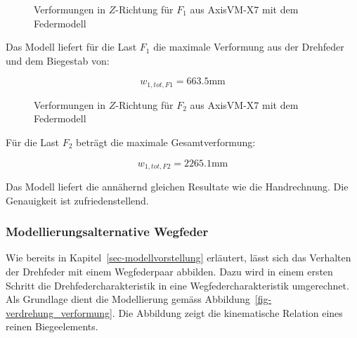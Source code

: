 \documentclass[
  11pt,
  letterpaper,
]{scrreprt}
\begin{document}
\begin{figure}[H]


\caption{\label{fig-kragarm-drehfeder-10}Verformungen in \(Z\)-Richtung
für \(F_1\) aus AxisVM-X7 mit dem Federmodell}

\end{figure}%

Das Modell liefert für die Last \(F_1\) die maximale Verformung aus der
Drehfeder und dem Biegestab von:

\[
w_{1,tot,F1} = 663.5 \text{mm}
\]

\begin{figure}[H]


\caption{\label{fig-kragarm-drehfeder-215}Verformungen in \(Z\)-Richtung
für \(F_2\) aus AxisVM-X7 mit dem Federmodell}

\end{figure}%

Für die Last \(F_2\) beträgt die maximale Gesamtverformung:

\[
w_{1,tot,F2} = 2265.1 \text{mm}
\]

Das Modell liefert die annähernd gleichen Resultate wie die
Handrechnung. Die Genauigkeit ist zufriedenstellend.

\subsubsection{Modellierungsalternative
Wegfeder}\label{modellierungsalternative-wegfeder}

Wie bereits in Kapitel~\ref{sec-modellvorstellung} erläutert, lässt sich
das Verhalten der Drehfeder mit einem Wegfederpaar abbilden. Dazu wird
in einem ersten Schritt die Drehfedercharakteristik in eine
Wegfedercharakteristik umgerechnet. Als Grundlage dient die Modellierung
gemäss Abbildung~\ref{fig-verdrehung_verformung}. Die Abbildung zeigt
die kinematische Relation eines reinen Biegeelements.
\end{document}
